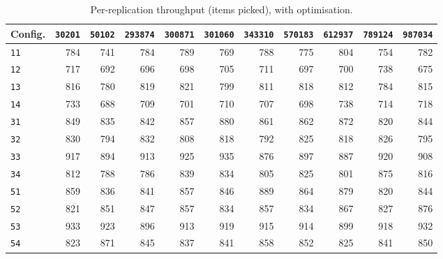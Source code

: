 \begin{table}[htb]
\centering
\small
\caption{Per-replication throughput (items picked), with optimisation.}
\label{tab:app_throughput_opt_true}
\begin{tabular}{@{}lrrrrrrrrrr@{}}
\toprule
\textbf{Config.} & \texttt{30201} & \texttt{50102} & \texttt{293874} & \texttt{300871} & \texttt{301060} & \texttt{343310} & \texttt{570183} & \texttt{612937} & \texttt{789124} & \texttt{987034} \\
\midrule
\texttt{11} & 784 & 741 & 784 & 789 & 769 & 788 & 775 & 804 & 754 & 782 \\
\texttt{12} & 717 & 692 & 696 & 698 & 705 & 711 & 697 & 700 & 738 & 675 \\
\texttt{13} & 816 & 780 & 819 & 821 & 799 & 811 & 818 & 812 & 784 & 815 \\
\texttt{14} & 733 & 688 & 709 & 701 & 710 & 707 & 698 & 738 & 714 & 718 \\
\texttt{31} & 849 & 835 & 842 & 857 & 880 & 861 & 862 & 872 & 820 & 844 \\
\texttt{32} & 830 & 794 & 832 & 808 & 818 & 792 & 825 & 818 & 826 & 795 \\
\texttt{33} & 917 & 894 & 913 & 925 & 935 & 876 & 897 & 887 & 920 & 908 \\
\texttt{34} & 812 & 788 & 786 & 839 & 834 & 805 & 825 & 801 & 875 & 816 \\
\texttt{51} & 859 & 836 & 841 & 857 & 846 & 889 & 864 & 879 & 820 & 844 \\
\texttt{52} & 821 & 851 & 847 & 857 & 834 & 857 & 834 & 867 & 827 & 876 \\
\texttt{53} & 933 & 923 & 896 & 913 & 919 & 915 & 914 & 899 & 918 & 932 \\
\texttt{54} & 823 & 871 & 845 & 837 & 841 & 858 & 852 & 825 & 841 & 850 \\
\bottomrule
\end{tabular}
\end{table}
